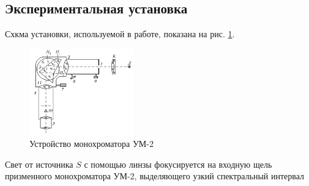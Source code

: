 \subsection*{Экспериментальная установка}

Схкма установки, используемой в работе, показана на рис. \ref{fig:exp1}.

\begin{figure}[h]
    \centering
    \includegraphics[width=0.4\textwidth]{um.png}
    \caption{Устройство монохроматора УМ-2}
    \label{fig:exp1}
\end{figure}

Свет от источника $S$ с помощью линзы фокусируется на входную щель призменного монохроматора УМ-2, выделяющего узкий спектральный интервал
